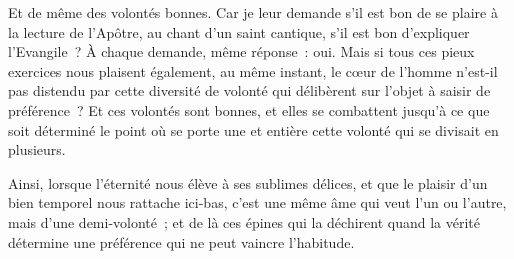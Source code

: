 \documentclass[french,twoside]{book} %
\begin{document}
Et de même des volontés bonnes. Car je leur demande s’il est bon de se plaire à la lecture de l’Apôtre, au chant d’un saint cantique, s’il est bon d’expliquer l’Evangile ? À chaque demande, même réponse : oui. Mais si tous ces pieux exercices nous plaisent également, au même instant, le cœur de l’homme n’est-il pas distendu par cette diversité de volonté qui délibèrent sur l’objet à saisir de préférence ? Et ces volontés sont bonnes, et elles se combattent jusqu’à ce que soit déterminé le point où se porte une et entière cette volonté qui se divisait en plusieurs.\par
Ainsi, lorsque l’éternité nous élève à ses sublimes délices, et que le plaisir d’un bien temporel nous rattache ici-bas, c’est une même âme qui veut l’un ou l’autre, mais d’une demi-volonté ; et de là ces épines qui la déchirent quand la vérité détermine une préférence qui ne peut vaincre l’habitude.
\end{document}
